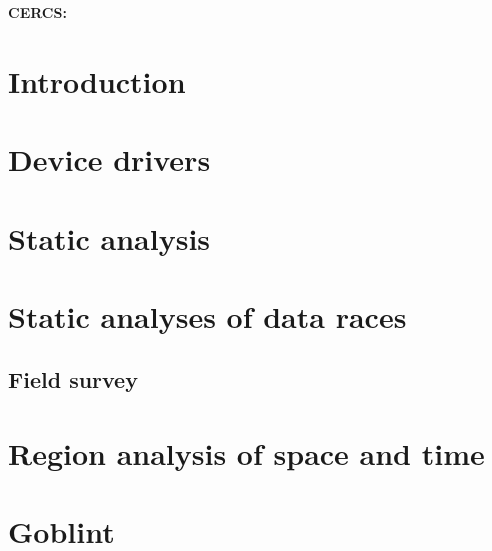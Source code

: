 \documentclass{style/master-thesis}
\begin{document}
\noindent\textbf{CERCS:}





\newpage
\tableofcontents



\section{Introduction}


\pagebreak

\section{Device drivers}


\pagebreak


\section{Static analysis} 


\pagebreak

\section{Static analyses of data races}


\subsection{Field survey}


\pagebreak


%

\section{Region analysis of space and time}


\pagebreak


\section{Goblint}
%

\end{document}
